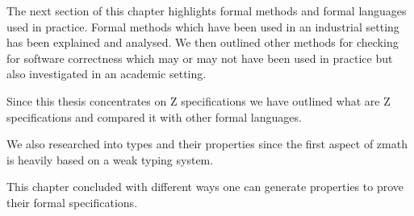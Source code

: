 The next section of this chapter highlights formal methods and formal languages used in practice. Formal methods which have been used in an industrial setting has been explained and analysed. We then outlined other methods for checking for software correctness which may or may not have been used in practice but also investigated in an academic setting.

Since this thesis concentrates on Z specifications we have outlined what are Z specifications and compared it with other formal languages. 

We also researched into types and their properties since the first aspect of \gls{zmath} is heavily based on a weak typing system.

This chapter concluded with different ways one can generate properties to prove their formal specifications.